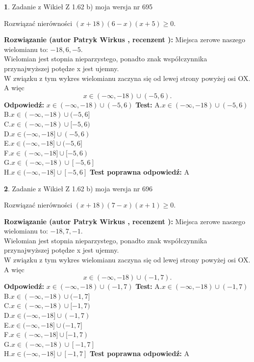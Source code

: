 \documentclass[12pt, a4paper]{article}
\theoremstyle{definition} %
\newtheorem{zad}{}
\newcommand{\zadStart}[1]{\begin{zad}#1\newline}
\newcommand{\zadStop}{\end{zad}}
\newcommand{\rozwStart}[2]{\noindent \textbf{Rozwiązanie (autor #1 , recenzent #2): }\newline}
\newcommand{\rozwStop}{\newline}
\newcommand{\odpStart}{\noindent \textbf{Odpowiedź:}\newline}
\newcommand{\odpStop}{\newline}
\newcommand{\testStart}{\noindent \textbf{Test:}\newline}
\newcommand{\testStop}{\newline}
\newcommand{\kluczStart}{\noindent \textbf{Test poprawna odpowiedź:}\newline}
\newcommand{\kluczStop}{\newline}
\begin{document}
\zadStart{Zadanie z Wikieł Z 1.62 b) moja wersja nr 695}

Rozwiązać nierówności $(x+18)(6-x)(x+5)\ge0$.
\zadStop
\rozwStart{Patryk Wirkus}{}
Miejsca zerowe naszego wielomianu to: $-18, 6, -5$.\\
Wielomian jest stopnia nieparzystego, ponadto znak współczynnika przy\linebreak najwyższej potędze x jest ujemny.\\ W związku z tym wykres wielomianu zaczyna się od lewej strony powyżej osi OX. A więc $$x \in (-\infty,-18) \cup (-5,6).$$
\rozwStop
\odpStart
$x \in (-\infty,-18) \cup (-5,6)$
\odpStop
\testStart
A.$x \in (-\infty,-18) \cup (-5,6)$\\
B.$x \in (-\infty,-18) \cup (-5,6]$\\
C.$x \in (-\infty,-18) \cup [-5,6)$\\
D.$x \in (-\infty,-18] \cup (-5,6)$\\
E.$x \in (-\infty,-18] \cup (-5,6]$\\
F.$x \in (-\infty,-18] \cup [-5,6)$\\
G.$x \in (-\infty,-18) \cup [-5,6]$\\
H.$x \in (-\infty,-18] \cup [-5,6]$
\testStop
\kluczStart
A
\kluczStop



\zadStart{Zadanie z Wikieł Z 1.62 b) moja wersja nr 696}

Rozwiązać nierówności $(x+18)(7-x)(x+1)\ge0$.
\zadStop
\rozwStart{Patryk Wirkus}{}
Miejsca zerowe naszego wielomianu to: $-18, 7, -1$.\\
Wielomian jest stopnia nieparzystego, ponadto znak współczynnika przy\linebreak najwyższej potędze x jest ujemny.\\ W związku z tym wykres wielomianu zaczyna się od lewej strony powyżej osi OX. A więc $$x \in (-\infty,-18) \cup (-1,7).$$
\rozwStop
\odpStart
$x \in (-\infty,-18) \cup (-1,7)$
\odpStop
\testStart
A.$x \in (-\infty,-18) \cup (-1,7)$\\
B.$x \in (-\infty,-18) \cup (-1,7]$\\
C.$x \in (-\infty,-18) \cup [-1,7)$\\
D.$x \in (-\infty,-18] \cup (-1,7)$\\
E.$x \in (-\infty,-18] \cup (-1,7]$\\
F.$x \in (-\infty,-18] \cup [-1,7)$\\
G.$x \in (-\infty,-18) \cup [-1,7]$\\
H.$x \in (-\infty,-18] \cup [-1,7]$
\testStop
\kluczStart
A
\kluczStop
\end{document}
